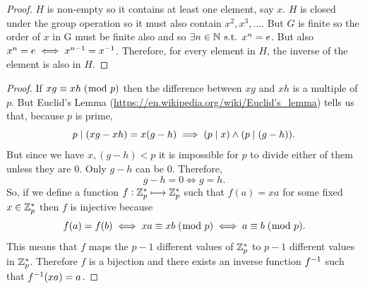\documentclass[MathsNotesBase.tex]{subfiles}
\begin{document}
{	
	\begin{proof}
		$H$ is non-empty so it contains at least one element, say ${ x }$. $H$ is closed under the group operation so it must also contain ${ x^2, x^3, \dots }$. But $G$ is finite so the order of $x$ in G must be finite also and so ${ \exists n \in \mathbb{N}^{} \text{ s.t. } x^n = e }$. But also ${ x^n = e \iff x^{n-1} = {x}^{-1} }$. Therefore, for every element in $H$, the inverse of the element is also in $H$.
	\end{proof}

	\begin{proof}
		If ${ xg \equiv xh \;(\bmod\; p) }$ then the difference between $xg$ and $xh$ is a multiple of $p$. But Euclid's Lemma (\url{https://en.wikipedia.org/wiki/Euclid's_lemma}) tells us that, because $p$ is prime, 
		\[ p \mid (xg - xh) = x(g - h) \implies (p \mid x) \wedge (p \mid (g-h)). \]
		But since we have ${ x,(g-h) < p }$ it is impossible for $p$ to divide either of them unless they are 0. Only ${ g-h }$ can be 0. Therefore,
		\[ g - h = 0 \iff g = h. \]
		So, if we define a function ${ f: \mathbb{Z}^{*}_p \longmapsto \mathbb{Z}^{*}_p }$ such that ${ f(a) = xa }$ for some fixed ${ x \in \mathbb{Z}^{*}_p }$ then $f$ is injective because
		\[ f(a) = f(b) \iff xa \equiv xb \;(\bmod\; p) \iff a \equiv b \;(\bmod\; p). \]
		This means that $f$ maps the ${ p-1 }$ different values of ${ \mathbb{Z}^{*}_p }$ to ${ p-1 }$ different values in ${ \mathbb{Z}^{*}_p }$. Therefore $f$ is a bijection and there exists an inverse function ${ {f}^{-1} }$ such that ${ {f}^{-1}(xa) = a }$.
	\end{proof}

	\medskip
}
\end{document}
